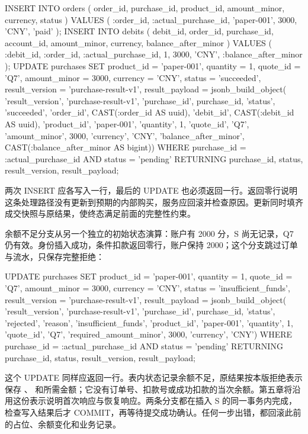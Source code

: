 \begin{BookCode}
INSERT INTO orders (
  order_id, purchase_id, product_id, amount_minor, currency, status
) VALUES (
  :order_id, :actual_purchase_id, 'paper-001', 3000, 'CNY', 'paid'
);
INSERT INTO debits (
  debit_id, order_id, purchase_id, account_id,
  amount_minor, currency, balance_after_minor
) VALUES (
  :debit_id, :order_id, :actual_purchase_id, 1,
  3000, 'CNY', :balance_after_minor
);
UPDATE purchases
SET product_id = 'paper-001', quantity = 1, quote_id = 'Q7',
    amount_minor = 3000, currency = 'CNY', status = 'succeeded',
    result_version = 'purchase-result-v1',
    result_payload = jsonb_build_object(
      'result_version', 'purchase-result-v1',
      'purchase_id', purchase_id, 'status', 'succeeded',
      'order_id', CAST(:order_id AS uuid),
      'debit_id', CAST(:debit_id AS uuid),
      'product_id', 'paper-001', 'quantity', 1,
      'quote_id', 'Q7', 'amount_minor', 3000, 'currency', 'CNY',
      'balance_after_minor', CAST(:balance_after_minor AS bigint))
WHERE purchase_id = :actual_purchase_id AND status = 'pending'
RETURNING purchase_id, status, result_version, result_payload;
\end{BookCode}

两次 INSERT 应各写入一行，最后的 UPDATE 也必须返回一行。返回零行说明这条处理路径没有更新到预期的内部购买，服务应回滚并检查原因。更新同时填齐成交快照与原结果，使终态满足前面的完整性约束。

余额不足分支从另一个独立的初始状态演算：账户有 2000 分，S 尚无记录，Q7 仍有效。身份插入成功，条件扣款返回零行，账户保持 2000；这个分支跳过订单与流水，只保存完整拒绝：

\begin{BookCode}
UPDATE purchases
SET product_id = 'paper-001', quantity = 1, quote_id = 'Q7',
    amount_minor = 3000, currency = 'CNY',
    status = 'insufficient_funds',
    result_version = 'purchase-result-v1',
    result_payload = jsonb_build_object(
      'result_version', 'purchase-result-v1',
      'purchase_id', purchase_id, 'status', 'rejected',
      'reason', 'insufficient_funds',
      'product_id', 'paper-001', 'quantity', 1,
      'quote_id', 'Q7', 'required_amount_minor', 3000,
      'currency', 'CNY')
WHERE purchase_id = :actual_purchase_id AND status = 'pending'
RETURNING purchase_id, status, result_version, result_payload;
\end{BookCode}

这个 UPDATE 同样应返回一行。表内状态记录余额不足，原结果按本版拒绝表示保存 、 和所需金额；它没有订单号、扣款号或成功扣款的当次余额。第五章将沿用这份表示说明首次响应与恢复响应。两条分支都在插入 S 的同一事务内完成，检查写入结果后才 COMMIT，再等待提交成功确认。任何一步出错，都回滚此前的占位、余额变化和业务记录。

